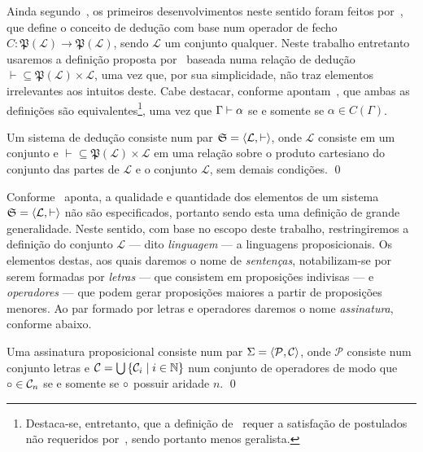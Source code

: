 Ainda segundo~\cite{Beziau-B}, os primeiros desenvolvimentos neste sentido foram feitos por~\cite{Tarski}, que define o conceito de dedução com base num operador de fecho $C\mathrel{:}\mathfrak{P}(\mathcal{L})\to\mathfrak{P}(\mathcal{L})$, sendo $\mathcal{L}$ um conjunto qualquer. Neste trabalho entretanto usaremos a definição proposta por~\cite{Beziau} baseada numa relação de dedução ${\vdash}\subseteq\mathfrak{P}(\mathcal{L})\times\mathcal{L}$, uma vez que, por sua simplicidade, não traz elementos irrelevantes aos intuitos deste. Cabe destacar, conforme apontam~\cite{Font}, que ambas as definições são equivalentes\footnote{Destaca-se, entretanto, que a definição de~\cite{Tarski} requer a satisfação de postulados não requeridos por~\cite{Beziau}, sendo portanto menos geralista.}, uma vez que $\Gamma\mathrel{\vdash}\alpha$ se e somente se $\alpha\in C(\Gamma)$.

\begin{tcolorbox}[enhanced jigsaw, breakable, sharp corners, colframe=black, colback=white, boxrule=0.5pt, left=1.5mm, right=1.5mm, top=1.5mm, bottom=1.5mm]
\begin{definition}[Sistema]
    Um sistema de dedução consiste num par $\mathfrak{S} = \langle\mathcal{L}, \vdash\rangle$, onde $\mathcal{L}$ consiste em um conjunto e ${\vdash}\subseteq\mathfrak{P}(\mathcal{L})\times\mathcal{L}$ em uma relação sobre o produto cartesiano do conjunto das partes de $\mathcal{L}$ e o conjunto $\mathcal{L}$, sem demais condições.
    \qed{}
\end{definition}
\end{tcolorbox}

Conforme~\cite{Beziau} aponta, a qualidade e quantidade dos elementos de um sistema $\mathfrak{S}=\langle\mathcal{L}, \vdash\rangle$ não são especificados, portanto sendo esta uma definição de grande generalidade. Neste sentido, com base no escopo deste trabalho, restringiremos a definição do conjunto $\mathcal{L}$ --- dito \emph{linguagem} --- a linguagens proposicionais. Os elementos destas, aos quais daremos o nome de \emph{sentenças}, notabilizam-se por serem formadas por \emph{letras} --- que consistem em proposições indivisas --- e \emph{operadores} --- que podem gerar proposições maiores a partir de proposições menores. Ao par formado por letras e operadores daremos o nome \emph{assinatura}, conforme abaixo.

\begin{tcolorbox}[enhanced jigsaw, breakable, sharp corners, colframe=black, colback=white, boxrule=0.5pt, left=1.5mm, right=1.5mm, top=1.5mm, bottom=1.5mm]
\begin{definition}[Assinatura]
    Uma assinatura proposicional consiste num par $\Sigma=\langle\mathcal{P},\mathcal{C}\rangle$, onde $\mathcal{P}$ consiste num conjunto letras e $\mathcal{C}=\bigcup\left\{\mathcal{C}_i\mid i\in\mathbb{N}\right\}$ num conjunto de operadores de modo que $\mathalpha{\circ}\in\mathcal{C}_n$ se e somente se $\mathalpha{\circ}$ possuir aridade $n$.
    \qed{}
\end{definition}
\end{tcolorbox}

